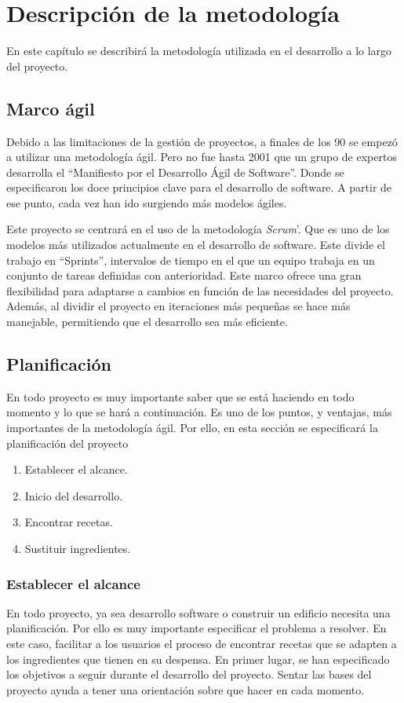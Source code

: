 \chapter{Descripción de la metodología}
En este capítulo se describirá la metodología utilizada en el desarrollo a lo largo del proyecto.

\section{Marco ágil}
Debido a las limitaciones de la gestión de proyectos, a finales de los 90 se empezó a utilizar una metodología ágil. Pero no fue hasta 2001 que un grupo de expertos desarrolla el ``Manifiesto por el Desarrollo Ágil de Software''. Donde se especificaron los doce principios clave para el desarrollo de software. A partir de ese punto, cada vez han ido surgiendo más modelos ágiles.

Este proyecto se centrará en el uso de la metodología \emph{Scrum}'. Que es uno de los modelos más utilizados actualmente en el desarrollo de software. Este divide el trabajo en ``Sprints'', intervalos de tiempo en el que un equipo trabaja en un conjunto de tareas definidas con anterioridad. Este marco ofrece una gran flexibilidad para adaptarse a cambios en función de las necesidades del proyecto. Además, al dividir el proyecto en iteraciones más pequeñas se hace más manejable, permitiendo que el desarrollo sea más eficiente.

\section{Planificación}
En todo proyecto es muy importante saber que se está haciendo en todo momento y lo que se hará a continuación. Es uno de los puntos, y ventajas, más importantes de la metodología ágil. Por ello, en esta sección se especificará la planificación del proyecto\:
\begin{enumerate}
    \item Establecer el alcance.
    \item Inicio del desarrollo.
    \item Encontrar recetas.
    \item Sustituir ingredientes.
\end{enumerate}

\subsection{Establecer el alcance}
En todo proyecto, ya sea desarrollo software o construir un edificio necesita una planificación. Por ello es muy importante especificar el problema a resolver. En este caso, facilitar a los usuarios el proceso de encontrar recetas que se adapten a los ingredientes que tienen en su despensa. En primer lugar, se han especificado los objetivos a seguir durante el desarrollo del proyecto. Sentar las bases del proyecto ayuda a tener una orientación sobre que hacer en cada momento. 

